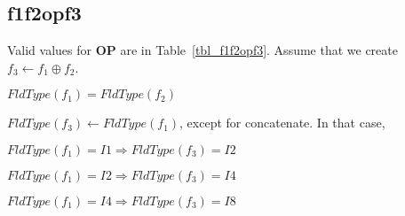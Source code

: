 \subsection{f1f2opf3}
\label{f1f2opf3}

Valid values for {\bf OP} are in Table~\ref{tbl_f1f2opf3}. 
Assume that we create \(f_3 \leftarrow f_1 \oplus f_2\).
\bi
\item \(FldType(f_1) = FldType(f_2)\)
\item \(FldType(f_3) \leftarrow FldType(f_1)\), except for concatenate. In that
case, 
\be
\item \(FldType(f_1) = I1 \Rightarrow FldType(f_3) = I2\)
\item \(FldType(f_1) = I2 \Rightarrow FldType(f_3) = I4\)
\item \(FldType(f_1) = I4 \Rightarrow FldType(f_3) = I8\)
\ee
\ei
